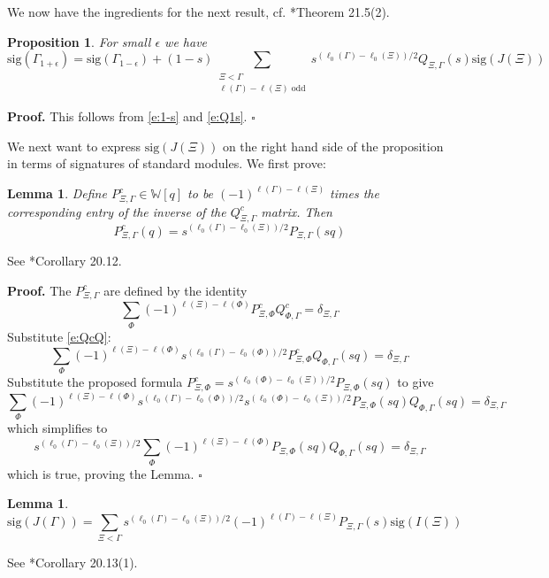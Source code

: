 \documentclass[12pt,leqno]{article}
\newtheorem{lemma}[equation]{Lemma}
\newtheorem{proposition}[equation]{Proposition}
\newcommand{\qed}{\hfill $\square$ \medskip}
\newenvironment{proof}[1][Proof]{\noindent\textbf{#1.} }{\qed}
\newcommand{\sig}{\text{sig}}
\newcommand{\W}{\mathbb W}
\begin{document}
We now have the ingredients for
the next result, cf. \cite{unitaryDual}*{Theorem 21.5(2)}.

\begin{proposition}
\label{p:deformform}
For small $\epsilon$ we have
\normalfont
$$
\sig(\Gamma_{1+\epsilon})=\sig(\Gamma_{1-\epsilon})+(1-s)
\sum_{\substack{\Xi<\Gamma\\\ell(\Gamma)-\ell(\Xi)\text{ odd}}} s^{(\ell_0(\Gamma)-\ell_0(\Xi))/2}Q_{\Xi,\Gamma}(s)\sig(J(\Xi))
$$
\end{proposition}

\begin{proof}
This follows from
\eqref{e:1-s}  and \eqref{e:Q1s}.
\end{proof}

We next want to express $\sig(J(\Xi))$ on the right hand side of the
proposition in terms of signatures of standard modules.
We first prove:

\begin{lemma}
\label{l:PcP}
Define $P^c_{\Xi,\Gamma}\in\W[q]$ to be
$(-1)^{\ell(\Gamma)-\ell(\Xi)}$ times the corresponding entry of the
inverse of the $Q^c_{\Xi,\Gamma}$ matrix.
Then
$$
P^c_{\Xi,\Gamma}(q)=s^{(\ell_0(\Gamma)-\ell_0(\Xi))/2}P_{\Xi,\Gamma}(sq)
$$
\end{lemma}
See \cite{unitaryDual}*{Corollary 20.12}.



\begin{proof}
The $P^c_{\Xi,\Gamma}$ are defined by the identity
$$
\sum_{\Phi}(-1)^{\ell(\Xi)-\ell(\Phi)}P^c_{\Xi,\Phi}Q^c_{\Phi,\Gamma}=\delta_{\Xi,\Gamma}
$$
Substitute \eqref{e:QcQ}:
$$
\sum_{\Phi}(-1)^{\ell(\Xi)-\ell(\Phi)}s^{(\ell_0(\Gamma)-\ell_0(\Phi))/2}P^c_{\Xi,\Phi}Q_{\Phi,\Gamma}(sq)=\delta_{\Xi,\Gamma}
$$
Substitute the proposed formula $P^c_{\Xi,\Phi}=s^{(\ell_0(\Phi)-\ell_0(\Xi))/2}P_{\Xi,\Phi}(sq)$
to give
$$
\sum_{\Phi}(-1)^{\ell(\Xi)-\ell(\Phi)}
s^{(\ell_0(\Gamma)-\ell_0(\Phi))/2}
s^{(\ell_0(\Phi)-\ell_0(\Xi))/2}
P_{\Xi,\Phi}(sq)Q_{\Phi,\Gamma}(sq)=\delta_{\Xi,\Gamma}
$$
which simplifies to
$$
s^{(\ell_0(\Gamma)-\ell_0(\Xi))/2}
\sum_{\Phi}(-1)^{\ell(\Xi)-\ell(\Phi)}
P_{\Xi,\Phi}(sq)Q_{\Phi,\Gamma}(sq)=\delta_{\Xi,\Gamma}
$$
which is true, proving the Lemma.
\end{proof}



\begin{lemma}
\label{l:P}
\normalfont
$$
\sig(J(\Gamma))=\sum_{\Xi<\Gamma}s^{(\ell_0(\Gamma)-\ell_0(\Xi))/2}(-1)^{\ell(\Gamma)-\ell(\Xi)}P_{\Xi,\Gamma}(s)\sig(I(\Xi))
$$
\end{lemma}
See \cite{unitaryDual}*{Corollary 20.13(1)}.
\end{document}
